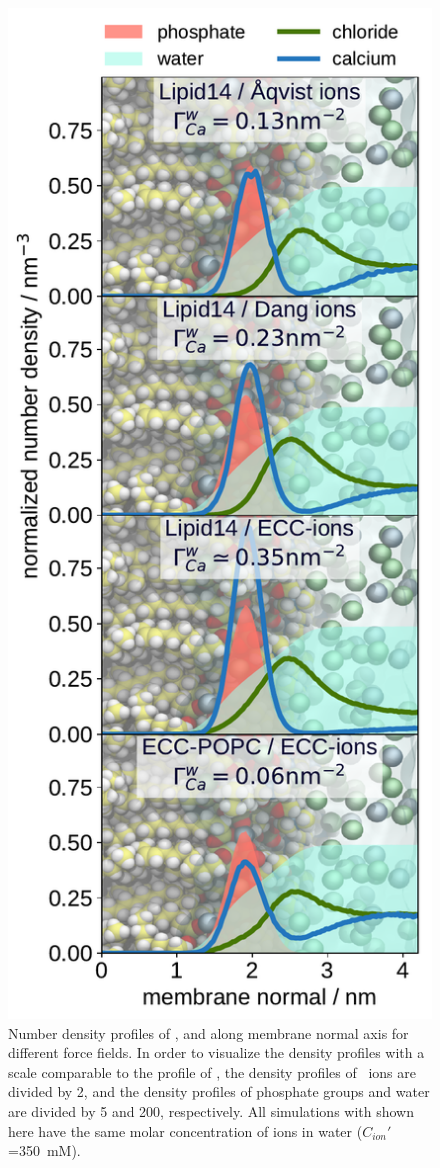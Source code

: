\begin{figure}[htbp!] 
  \centering 
  \includegraphics[width=\figwidth]{../img/ecc_popc/density_profiles_ca_cl_wat_phos_models-compar_1-4.pdf} 
  \caption{\label{fig:cacl-dens} 
    Number density profiles of ,  and  along membrane normal axis 
    for different force fields. 
    In order to visualize the density profiles with a scale comparable to the profile of ,  
    the density profiles of~ ions are divided by 2, and 
    the density profiles of phosphate groups and water are divided by 5 and 200, respectively.  
    All simulations with  shown here have the same molar concentration of ions in water ($C_{ion}'$=350~mM). 
    } 
\end{figure} 


